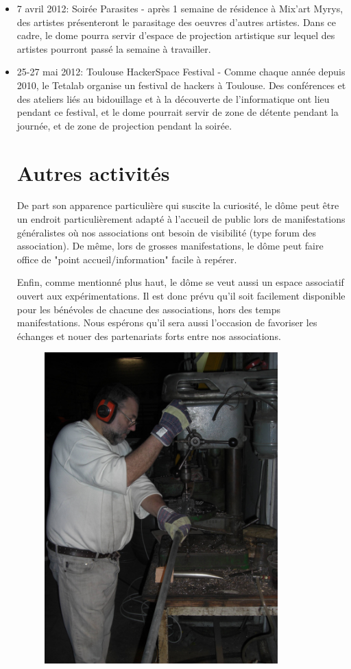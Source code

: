 \documentclass[a4paper,12pt]{report}
\begin{document}
\begin{itemize}
  \item 7 avril 2012: Soirée Parasites - après 1 semaine de résidence à Mix'art Myrys, des artistes 
  présenteront le parasitage des oeuvres d'autres artistes. Dans ce cadre, le dome pourra servir 
  d'espace de projection artistique sur lequel des artistes pourront passé la semaine à travailler.

  \item 25-27 mai 2012: Toulouse HackerSpace Festival - Comme chaque année depuis 2010, le Tetalab
  organise un festival de hackers à Toulouse. Des conférences et des ateliers liés au bidouillage
  et à la découverte de l'informatique ont lieu pendant ce festival, et le dome pourrait servir de
  zone de détente pendant la journée, et de zone de projection pendant la soirée.

\section{Autres activités}

De part son apparence particulière qui suscite la curiosité, le dôme peut être
un endroit particulièrement adapté à l'accueil de public lors de manifestations
généralistes où nos associations ont besoin de visibilité (type forum des
association). De même, lors de grosses manifestations, le dôme peut faire
office de "point accueil/information" facile à repérer.

Enfin, comme mentionné plus haut, le dôme se veut aussi un espace associatif
ouvert aux expérimentations. Il est donc prévu qu'il soit facilement disponible
pour les bénévoles de chacune des associations, hors des temps manifestations.
Nous espérons qu'il sera aussi l'occasion de favoriser les échanges et nouer
des partenariats forts entre nos associations.

\begin{figure}[!h]
\centering
\includegraphics[width=9cm]{percage.jpg}
\end{figure}



\end{itemize}
\end{document}
